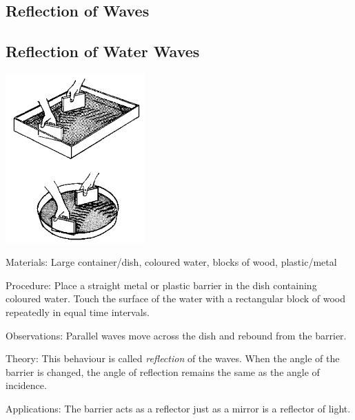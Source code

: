 \begin{multicols}{2}

\section*{Reflection of Waves}


\subsection{Reflection of Water Waves}

\begin{center}
\includegraphics[width=0.4\textwidth]{./img/source/reflection-water-waves.png}
\end{center}

\begin{description*}
\item[Materials:]{Large container/dish, coloured water, blocks of wood, plastic/metal}
\item[Procedure:]{Place a straight metal or plastic barrier in the dish containing coloured water. Touch the surface of the water with a rectangular block of wood repeatedly in equal time intervals.}
\item[Observations:]{Parallel waves move across the dish and rebound from the barrier.}
\item[Theory:]{This behaviour is called \emph{reflection} of the waves. When the angle of the barrier is changed, the angle of reflection remains the same as the angle of incidence.}
\item[Applications:]{The barrier acts as a reflector just as a mirror is a reflector of light.}
\end{description*}


\end{multicols}
